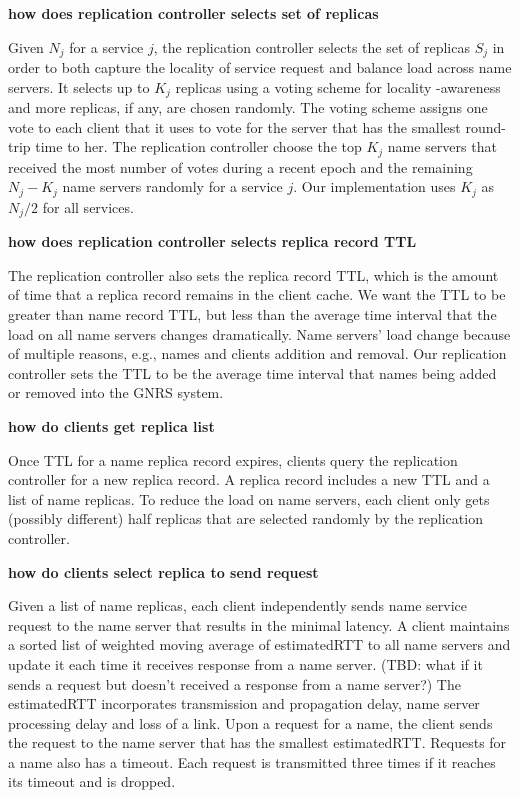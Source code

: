{{{\bf how does replication controller selects set of replicas}

Given $N_j$ for a service $j$, the replication controller selects the set of replicas $S_j$ in order to both capture the locality of service request and balance load across name servers. It selects up to $K_j$ replicas using a voting scheme for locality
-awareness and more replicas, if any, are chosen randomly. The voting scheme assigns one vote to each client that it uses to vote for the server that has the smallest round-trip time to her. The replication controller choose the top $K_j$ name servers that received the most number of votes during a recent epoch and the remaining $N_j - K_j$ name servers randomly for a service $j$. Our implementation uses $K_j$ as $N_j/2$ for all services.

{\bf how does replication controller selects replica record TTL}

The replication controller also sets the replica record TTL, which is the amount of time that a replica record remains in the client cache.  We want the TTL to be greater than name record TTL, but less than the average time interval that the load on all name servers changes dramatically. Name servers' load change because of multiple reasons, e.g., names and clients addition and removal. Our replication controller sets the TTL to be the average time interval that names being added or removed into the GNRS system.  

{\bf how do clients get replica list}

Once TTL for a name replica record expires, clients query the replication controller for a new replica record. A replica record includes a new TTL and a list of name replicas. To reduce the load on name servers, each client only gets (possibly different) half replicas that are selected randomly by the replication controller. 
  
{\bf how do clients select replica to send request}

Given a list of name replicas, each client independently sends name service request to the name server that results in the minimal latency. A client maintains a sorted list of weighted moving average of estimatedRTT to all name servers and update it each time it receives response from a name server. (TBD: what if it sends a request but doesn't received a response from a name server?) The estimatedRTT incorporates transmission and propagation delay, name server processing delay and loss of a link. Upon a request for a name, the client sends the request to the name server that has the smallest estimatedRTT. Requests for a name also has a timeout.  Each request is transmitted three times if it reaches its timeout and is dropped. 
}




}
